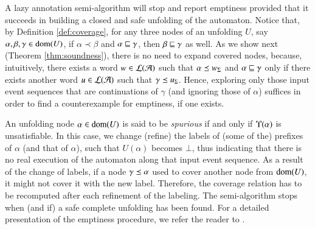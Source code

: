 
A lazy annotation semi-algorithm will stop and report emptiness
provided that it succeeds in building a closed and safe unfolding of
the automaton. Notice that, by Definition \ref{def:coverage}, for any
three nodes of an unfolding $U$, say $\alpha,\beta,\gamma \in
\mathrm{dom}(U)$, if $\alpha \prec \beta$ and $\alpha \sqsubseteq \gamma$, then
$\beta \sqsubseteq \gamma$ as well. As we show next (Theorem
\ref{thm:soundness}), there is no need to expand covered nodes,
because, intuitively, there exists a word $w \in {\mathcal L}({\mathcal{A}})$ such that
$\alpha \preceq {w}_\Sigma$ and $\alpha \sqsubseteq \gamma$ only if there
exists another word $u \in {\mathcal L}({\mathcal{A}})$ such that $\gamma \preceq
{u}_\Sigma$. Hence, exploring only those input event sequences that are
continuations of $\gamma$ (and ignoring those of $\alpha$) suffices in
order to find a counterexample for emptiness, if one exists.

An unfolding node $\alpha \in \mathrm{dom}(U)$ is said to be \emph{spurious}
if and only if $\Upsilon({\alpha})$ is unsatisfiable. In this case, we
change (refine) the labels of (some of the) prefixes of $\alpha$ (and
that of $\alpha$), such that $U(\alpha)$ becomes $\bot$, thus
indicating that there is no real execution of the automaton along that
input event sequence. As a result of the change of labels, if a node
$\gamma \preceq \alpha$ used to cover another node from $\mathrm{dom}(U)$, it
might not cover it with the new label. Therefore, the coverage
relation has to be recomputed after each refinement of the
labeling. The semi-algorithm stops when (and if) a safe complete
unfolding has been found. For a detailed presentation of the emptiness
procedure, we refer the reader to \cite{IosifXu18}. 

